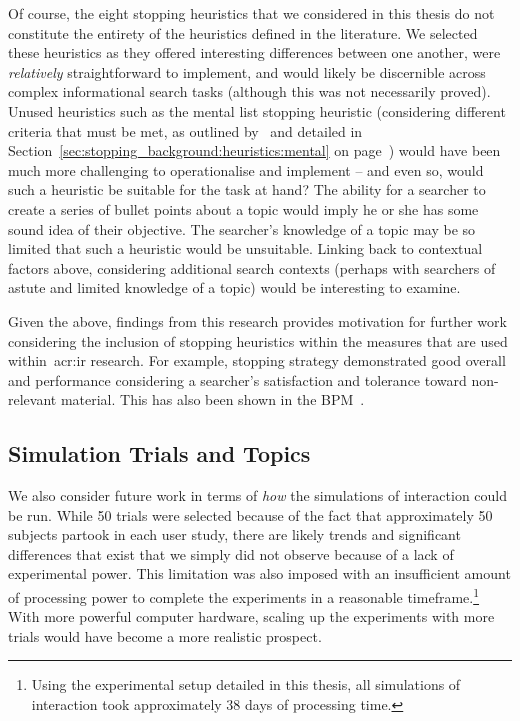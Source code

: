 Of course, the eight stopping heuristics that we considered in this thesis do not constitute the entirety of the heuristics defined in the literature. We selected these heuristics as they offered interesting differences between one another, were \emph{relatively} straightforward to implement, and would likely be discernible across complex informational search tasks (although this was not necessarily proved). Unused heuristics such as the mental list stopping heuristic (considering different criteria that must be met, as outlined by~\cite{nickles1995judgment} and detailed in Section~\ref{sec:stopping_background:heuristics:mental} on page~\pageref{sec:stopping_background:heuristics:mental}) would have been much more challenging to operationalise and implement -- and even so, would such a heuristic be suitable for the task at hand? The ability for a searcher to create a series of bullet points about a topic would imply he or she has some sound idea of their objective. The searcher's knowledge of a topic may be so limited that such a heuristic would be unsuitable. Linking back to contextual factors above, considering additional search contexts (perhaps with searchers of astute and limited knowledge of a topic) would be interesting to examine.

Given the above, findings from this research provides motivation for further work considering the inclusion of stopping heuristics within the measures that are used within~\gls{acr:ir} research. For example, stopping strategy  demonstrated good overall and performance considering a searcher's satisfaction and tolerance toward non-relevant material. This has also been shown in the BPM~\citep{zhang2017bejewled}.

\subsection{Simulation Trials and Topics}\label{sec:conclusions:future:running}
We also consider future work in terms of \emph{how} the simulations of interaction could be run. While 50 trials were selected because of the fact that approximately 50 subjects partook in each user study, there are likely trends and significant differences that exist that we simply did not observe because of a lack of experimental power. This limitation was also imposed with an insufficient amount of processing power to complete the experiments in a reasonable timeframe.\footnote{Using the experimental setup detailed in this thesis, all simulations of interaction took approximately $38$ days of processing time.} With more powerful computer hardware, scaling up the experiments with more trials would have become a more realistic prospect.

